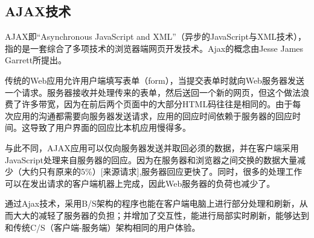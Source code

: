 \subsection{AJAX技术}
AJAX即“Asynchronous JavaScript and XML”（异步的JavaScript与XML技术），指的是一套综合了多项技术的浏览器端网页开发技术。Ajax的概念由Jesse James Garrett所提出。

传统的Web应用允许用户端填写表单（form），当提交表单时就向Web服务器发送一个请求。服务器接收并处理传来的表单，然后送回一个新的网页，但这个做法浪费了许多带宽，因为在前后两个页面中的大部分HTML码往往是相同的。由于每次应用的沟通都需要向服务器发送请求，应用的回应时间依赖于服务器的回应时间。这导致了用户界面的回应比本机应用慢得多。

与此不同，AJAX应用可以仅向服务器发送并取回必须的数据，并在客户端采用JavaScript处理来自服务器的回应。因为在服务器和浏览器之间交换的数据大量减少（大约只有原来的5\%）[来源请求],服务器回应更快了。同时，很多的处理工作可以在发出请求的客户端机器上完成，因此Web服务器的负荷也减少了。

通过Ajax技术，采用B/S架构的程序也能在客户端电脑上进行部分处理和刷新，从而大大的减轻了服务器的负担；并增加了交互性，能进行局部实时刷新，能够达到和传统C/S（客户端-服务端）架构相同的用户体验。